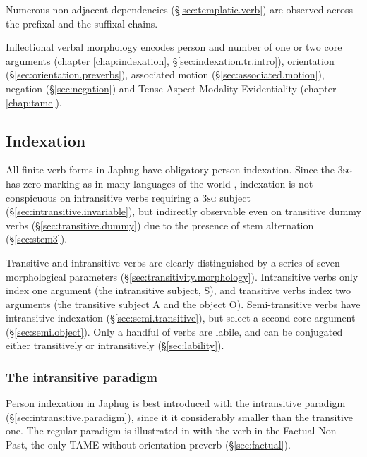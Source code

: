  Numerous non-adjacent dependencies (§\ref{sec:templatic.verb}) are observed across the prefixal and the suffixal chains.
 
Inflectional verbal morphology encodes person and number of one or two core arguments (chapter \ref{chap:indexation}, §\ref{sec:indexation.tr.intro}), orientation (§\ref{sec:orientation.preverbs}), associated motion (§\ref{sec:associated.motion}), negation (§\ref{sec:negation}) and Tense-Aspect-Modality-Evidentiality (chapter \ref{chap:tame}). 
 
 
\subsection{Indexation} \label{sec:indexation.intro}
All finite verb forms in Japhug have obligatory person indexation. Since the \textsc{3sg} has zero marking as in many languages of the world \citep[227--236]{benveniste66problemes1}, indexation is not conspicuous on intransitive verbs requiring a \textsc{3sg} subject (§\ref{sec:intransitive.invariable}), but indirectly observable even on transitive dummy verbs (§\ref{sec:transitive.dummy}) due to the presence of stem alternation (§\ref{sec:stem3}).

Transitive and intransitive verbs are clearly distinguished by a series of seven morphological parameters (§\ref{sec:transitivity.morphology}). Intransitive verbs only index one argument (the intransitive subject, S), and transitive verbs index two arguments (the transitive subject A and the object O). Semi-transitive verbs have intransitive indexation (§\ref{sec:semi.transitive}), but select a second core argument (§\ref{sec:semi.object}). Only a handful of verbs are labile, and can be conjugated either transitively or intransitively (§\ref{sec:lability}).

\subsubsection{The intransitive paradigm}
Person indexation in Japhug is best introduced with the intransitive paradigm (§\ref{sec:intransitive.paradigm}), since it it considerably smaller than the transitive one. The regular paradigm is illustrated in  with the verb  in the Factual Non-Past, the only TAME without orientation preverb (§\ref{sec:factual}).
 
